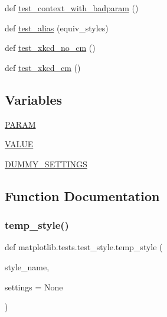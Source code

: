 \begin{DoxyCompactItemize}
\item 
def \hyperlink{namespacematplotlib_1_1tests_1_1test__style_a3c5e66702ed86694a7d787de3c2dc0ac}{test\+\_\+context\+\_\+with\+\_\+badparam} ()
\item 
def \hyperlink{namespacematplotlib_1_1tests_1_1test__style_aa38369cc5dfdcd04eb337761de32ae3b}{test\+\_\+alias} (equiv\+\_\+styles)
\item 
def \hyperlink{namespacematplotlib_1_1tests_1_1test__style_ad67475343de835fa66f9f78ca8f2da3e}{test\+\_\+xkcd\+\_\+no\+\_\+cm} ()
\item 
def \hyperlink{namespacematplotlib_1_1tests_1_1test__style_adeb2ec6b6d689600b446f0e2bf41c755}{test\+\_\+xkcd\+\_\+cm} ()
\end{DoxyCompactItemize}
\subsection*{Variables}
\begin{DoxyCompactItemize}
\item 
\hyperlink{namespacematplotlib_1_1tests_1_1test__style_a182aa927e0d22dcf1fae775dff32da48}{P\+A\+R\+AM}
\item 
\hyperlink{namespacematplotlib_1_1tests_1_1test__style_aa7d6c91e0f05892e7021af66d191b1ce}{V\+A\+L\+UE}
\item 
\hyperlink{namespacematplotlib_1_1tests_1_1test__style_a82c3c9490597dc64efa2e6b01e734358}{D\+U\+M\+M\+Y\+\_\+\+S\+E\+T\+T\+I\+N\+GS}
\end{DoxyCompactItemize}


\subsection{Function Documentation}
\mbox{\label{namespacematplotlib_1_1tests_1_1test__style_a3833b0d4e984c252d6b84e9cf672e961}} 
\subsubsection{\texorpdfstring{temp\+\_\+style()}{temp\_style()}}
{\footnotesize\ttfamily def matplotlib.\+tests.\+test\+\_\+style.\+temp\+\_\+style (\begin{DoxyParamCaption}\item[{}]{style\+\_\+name,  }\item[{}]{settings = {\ttfamily None} }\end{DoxyParamCaption})}

